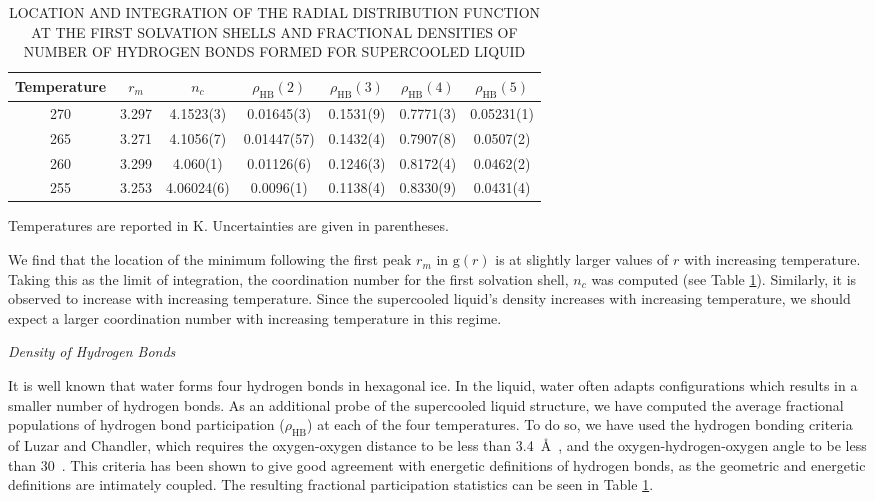 \begin{table}[h] \centering \caption{LOCATION AND INTEGRATION OF THE
    RADIAL DISTRIBUTION FUNCTION AT THE FIRST SOLVATION SHELLS AND
    FRACTIONAL DENSITIES OF NUMBER OF HYDROGEN BONDS FORMED FOR
    SUPERCOOLED LIQUID\label{tab:gofr}}
\begin{tabular}{ccccccc}
  \hline
  \hline
  Temperature & $r_m$ & $n_c$ & $\rho_\mathrm{HB}(2)$ & $\rho_\mathrm{HB}(3)$ & $\rho_\mathrm{HB}(4)$ & $\rho_\mathrm{HB}(5)$ \\
  \hline
  270 & 3.297 &4.1523(3) & 0.01645(3) & 0.1531(9) & 0.7771(3) & 0.05231(1)\\
  265 & 3.271 & 4.1056(7) & 0.01447(57) & 0.1432(4) & 0.7907(8) & 0.0507(2)\\
  260 & 3.299 & 4.060(1) & 0.01126(6) & 0.1246(3) & 0.8172(4) & 0.0462(2)\\
  255 & 3.253 & 4.06024(6)  & 0.0096(1) & 0.1138(4) & 0.8330(9) &
                                                                  0.0431(4) \\
  \hline
  \hline
\end{tabular}
\begin{flushleft}
Temperatures are reported in K. Uncertainties are given in parentheses.
\end{flushleft}
\end{table}

We find that the location of the minimum following the first peak
$r_m$ in $\mathrm{g}(r)$ is at slightly larger values of $r$ with
increasing temperature. Taking this as the limit of integration, the
coordination number for the first solvation shell, $n_c$ was computed
(see Table \ref{tab:gofr}). Similarly, it is observed to increase with
increasing temperature. Since the supercooled liquid's density
increases with increasing temperature, we should expect a larger
coordination number with increasing temperature in this regime.

\begin{flushleft}
\textit{Density of Hydrogen Bonds}
\end{flushleft}

It is well known that water forms four hydrogen bonds in hexagonal
ice. In the liquid, water often adapts configurations which results in
a smaller number of hydrogen bonds. As an additional probe of the
supercooled liquid structure, we have computed the average fractional
populations of hydrogen bond participation ($\rho_\mathrm{HB}$) at
each of the four temperatures. To do so, we have used the hydrogen
bonding criteria of Luzar and Chandler, which requires the
oxygen-oxygen distance to be less than 3.4~\AA~, and the
oxygen-hydrogen-oxygen angle to be less than
30\degree~.\cite{Luzar1996} This criteria has been shown to give good
agreement with energetic definitions of hydrogen bonds, as the
geometric and energetic definitions are intimately coupled. The
resulting fractional participation statistics can be seen in Table
\ref{tab:gofr}.


